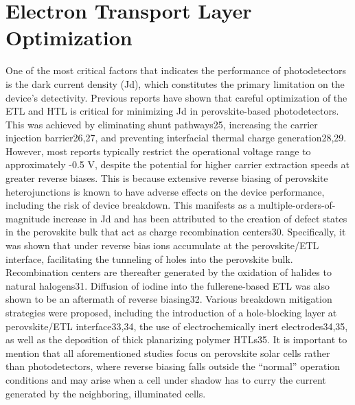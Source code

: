 \chapter{Electron Transport Layer Optimization}\label{ch:transport_layer}


One of the most critical factors that indicates the performance of photodetectors is the dark current density (Jd), which constitutes the primary limitation on the device’s detectivity. Previous reports have shown that careful optimization of the ETL and HTL is critical for minimizing Jd in perovskite-based photodetectors. This was achieved by eliminating shunt pathways25, increasing the carrier injection barrier26,27, and preventing interfacial thermal charge generation28,29. However, most reports typically restrict the operational voltage range to approximately -0.5 V, despite the potential for higher carrier extraction speeds at greater reverse biases. This is because extensive reverse biasing of perovskite heterojunctions is known to have adverse effects on the device performance, including the risk of device breakdown. This manifests as a multiple-orders-of-magnitude increase in Jd and has been attributed to the creation of defect states in the perovskite bulk that act as charge recombination centers30. Specifically, it was shown that under reverse bias ions accumulate at the perovskite/ETL interface, facilitating the tunneling of holes into the perovskite bulk. Recombination centers are thereafter generated by the oxidation of halides to natural halogens31. Diffusion of iodine into the fullerene-based ETL was also shown to be an aftermath of reverse biasing32. Various breakdown mitigation strategies were proposed, including the introduction of a hole-blocking layer at perovskite/ETL interface33,34, the use of electrochemically inert electrodes34,35, as well as the deposition of thick planarizing polymer HTLs35. It is important to mention that all aforementioned studies focus on perovskite solar cells rather than photodetectors, where reverse biasing falls outside the “normal” operation conditions and may arise when a cell under shadow has to curry the current generated by the neighboring, illuminated cells.


\cleardoublepage

